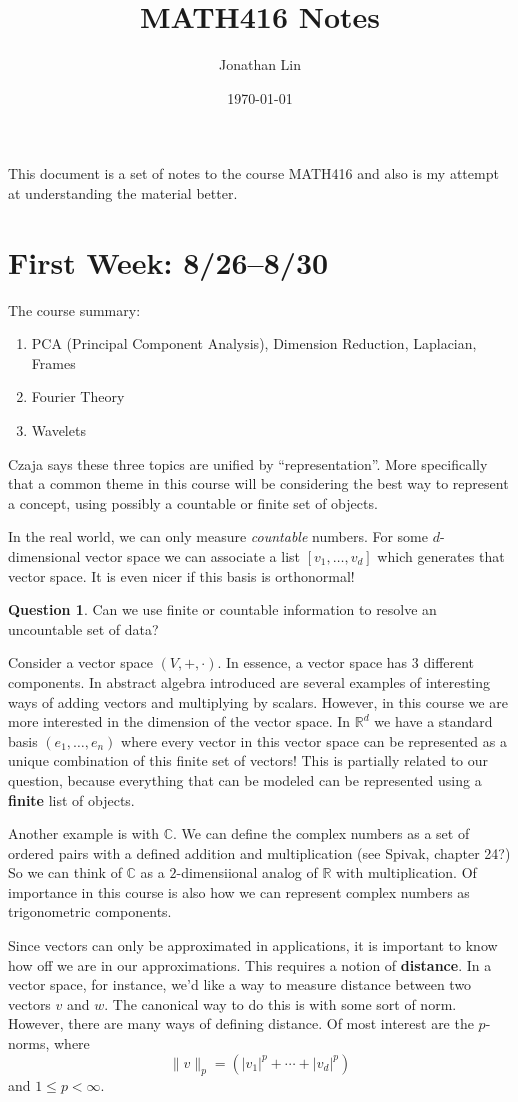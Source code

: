\documentclass[12pt]{article}
\title{MATH416 Notes}
\author{Jonathan Lin}
\date{\today}
\theoremstyle{plain}
\theoremstyle{definition}
\newtheorem{question}{Question}
\begin{document}
This document is a set of notes to the course MATH416 and also is my attempt at understanding the material better.

\section{First Week: 8/26--8/30}
The course summary:
\begin{enumerate}
	\item PCA (Principal Component Analysis), Dimension Reduction, Laplacian, Frames
	\item Fourier Theory
	\item Wavelets
\end{enumerate}
Czaja says these three topics are unified by ``representation''. More specifically that a common theme in this course will be considering the best way to represent a concept, using possibly a countable or finite set of objects.

In the real world, we can only measure \textit{countable} numbers. For some $d$-dimensional vector space we can associate a list $[v_1, \dotsc, v_d]$ which generates that vector space. It is even nicer if this basis is orthonormal!

\begin{question}
	Can we use finite or countable information to resolve an uncountable set of data?
\end{question}

Consider a vector space $(V, +, \cdot )$. In essence, a vector space has $3$ different components. In abstract algebra introduced are several examples of interesting ways of adding vectors and multiplying by scalars. However, in this course we are more interested in the dimension of the vector space. In $\mathbb{R}^d$ we have a standard basis $(e_1, \dots, e_n)$ where every vector in this vector space can be represented as a unique combination of this finite set of vectors! This is partially related to our question, because everything that can be modeled can be represented using a \textbf{finite} list of objects.

Another example is with $\mathbb{C}$. We can define the complex numbers as a set of ordered pairs with a defined addition and multiplication (see Spivak, chapter 24?) So we can think of $\mathbb{C}$ as a $2$-dimensiional analog of $\mathbb{R}$ with multiplication. Of importance in this course is also how we can represent complex numbers as trigonometric components. 

Since vectors can only be approximated in applications, it is important to know how off we are in our approximations. This requires a notion of \textbf{distance}. In a vector space, for instance, we'd like a way to measure distance between two vectors $v$ and $w$. The canonical way to do this is with some sort of norm. However, there are many ways of defining distance. Of most interest are the $p$-norms, where 
\[ \|v\|_p = \left(|v_1|^p + \cdots + |v_d|^p\right) \]
and $1 \leq p < \infty$.
\end{document}
